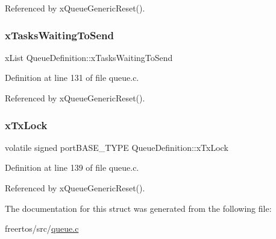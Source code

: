 Referenced by x\+Queue\+Generic\+Reset().

\mbox{\label{structQueueDefinition_a073ad0a31a51508395efd54599c73ee1}} 
\subsubsection{\texorpdfstring{x\+Tasks\+Waiting\+To\+Send}{xTasksWaitingToSend}}
{\footnotesize\ttfamily x\+List Queue\+Definition\+::x\+Tasks\+Waiting\+To\+Send}



Definition at line 131 of file queue.\+c.



Referenced by x\+Queue\+Generic\+Reset().

\mbox{\label{structQueueDefinition_a393aeeb16596b1be505014b57158c995}} 
\subsubsection{\texorpdfstring{x\+Tx\+Lock}{xTxLock}}
{\footnotesize\ttfamily volatile signed port\+B\+A\+S\+E\+\_\+\+T\+Y\+PE Queue\+Definition\+::x\+Tx\+Lock}



Definition at line 139 of file queue.\+c.



Referenced by x\+Queue\+Generic\+Reset().



The documentation for this struct was generated from the following file\+:\begin{DoxyCompactItemize}
\item 
freertos/src/\mbox{\hyperlink{queue_8c}{queue.\+c}}\end{DoxyCompactItemize}
